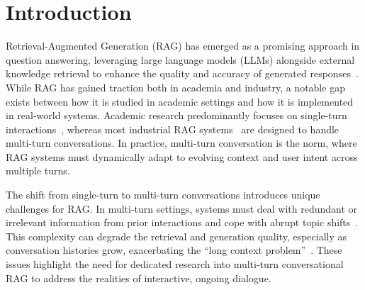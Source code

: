 \documentclass[11pt]{article}
\begin{document}
\section{Introduction}\label{introduction} 
Retrieval-Augmented Generation (RAG) has emerged as a promising approach in question answering, leveraging large language models (LLMs) alongside external knowledge retrieval to enhance the quality and accuracy of generated responses~\citep{Lewis_nips20_rag,guu_realm,huang_rag_survey}. While RAG has gained traction both in academia and industry, a notable gap exists between how it is studied in academic settings and how it is implemented in real-world systems. Academic research predominantly focuses on single-turn interactions~\citep{tan_acl24_simplm,jin_acl24_bider,wang_richrag,dong2024toward,zhu_spring}, whereas most industrial RAG systems~\cite{chatgpt,claude,kimichat,doubao} are designed to handle multi-turn conversations. In practice, multi-turn conversation is the norm, where RAG systems must dynamically adapt to evolving context and user intent across multiple turns.

The shift from single-turn to multi-turn conversations introduces unique challenges for RAG. In multi-turn settings, systems must deal with redundant or irrelevant information from prior interactions and cope with abrupt topic shifts~\citep{ye_sigir24_convrag,topiocqa}. This complexity can degrade the retrieval and generation quality, especially as conversation histories grow, exacerbating the ``long context problem''~\citep{Ratner_ACL23_PCW,LongRoPE}. These issues highlight the need for dedicated research into multi-turn conversational RAG to address the realities of interactive, ongoing dialogue.
\end{document}
